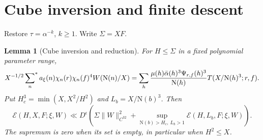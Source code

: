 \documentclass[11pt,a4paper]{article}
\numberwithin{equation}{section}
\newtheorem{lemma}[theorem]{Lemma}
\theoremstyle{definition}
\theoremstyle{remark}
\newcommand{\N}{\mathrm N}
\newcommand{\E}{\mathcal E}
\newcommand{\sfstar}{\sideset{}{^*}\sum}
\begin{document}
\section{Cube inversion and finite descent}\label{sec:descent}
Restore $\tau=\alpha^{-k}$, $k\ge1$. Write $\Sigma=XF$.
\begin{lemma}[Cube inversion and reduction]\label{lem:cube}
For $H\le\Sigma$ in a fixed polynomial parameter range,
\begin{equation}\label{eq:cubeidentity}
 X^{-1/2}\sfstar_n a_\xi(n)\chi_n(r)\chi_n(f)^4W(\N(n)/X)
 =\sum_h\frac{\mu(h)\bar\alpha(h)^3\Psi_{r,f}(h)^3}{\N(h)}T(X/\N(h)^3;r,f).
\end{equation}
Put $H_c^3=\min(X,X^2/H^2)$ and $L_b=X/\N(b)^3$. Then
\begin{equation}\label{eq:cubereduction}
 \E(H,X,F;\xi,W)\ll D^\epsilon\left(
 \Sigma\|W\|_{C^{32}}^2+
 \sup_{\N(b)>H_c,\ L_b>1}\E(H,L_b,F;\xi,W)\right).
\end{equation}
The supremum is zero when its set is empty, in particular when $H^2\le X$.
\end{lemma}
\end{document}
